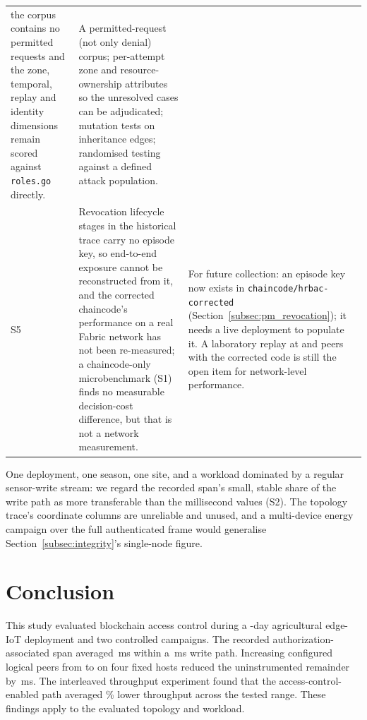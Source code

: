 \documentclass[a4paper,fleqn]{cas-sc}
\begin{document}
\begin{table}[pos=t]
\begin{tabularx}{\columnwidth}{@{}p{}Xp{}@{}}
     the corpus contains no permitted requests and the zone, temporal,
     replay and identity dimensions remain scored against
     \texttt{roles.go} directly. &
     A permitted-request (not only denial) corpus; per-attempt zone and
     resource-ownership attributes so the unresolved cases can be
     adjudicated; mutation tests on inheritance edges; randomised testing
     against a defined attack population. \\
S5 & Revocation lifecycle stages in the historical trace carry no episode
     key, so end-to-end exposure cannot be reconstructed from it, and the
     corrected chaincode's performance on a real Fabric network has not
     been re-measured; a chaincode-only microbenchmark (S1) finds no
     measurable decision-cost difference, but that is not a network
     measurement. &
     For future collection: an episode key now exists in
     \texttt{chaincode/\allowbreak hrbac-corrected} (Section~\ref{subsec:pm_revocation});
     it needs a live deployment to populate it. A laboratory replay at
     \ScaleMinPeers{} and \ScaleMaxPeers{} peers with the corrected code
     is still the open item for network-level performance. \\
\bottomrule
\end{tabularx}
\end{table}

One deployment, one season, one site, and a workload dominated by a
regular sensor-write stream: we regard the recorded span's small, stable
share of the write path as more transferable than the millisecond values
(S2). The topology trace's coordinate columns are unreliable and unused,
and a multi-device energy campaign over the full authenticated frame would
generalise Section~\ref{subsec:integrity}'s single-node figure.

\FloatBarrier
\section{Conclusion}
\label{sec:conclusion}

This study evaluated blockchain access control during a \DeployDays-day
agricultural edge-IoT deployment and two controlled campaigns. The recorded
authorization-associated span averaged \PartAccess\,ms within a
\PartTotal\,ms write path. Increasing configured logical peers from
\ScaleMinPeers{} to \ScaleMaxPeers{} on four fixed hosts reduced the
uninstrumented remainder by \PartEndorser\,ms. The interleaved throughput
experiment found that the access-control-enabled path averaged
\OverheadMeanPct\% lower throughput across the tested range. These findings
apply to the evaluated topology and workload.
\end{document}
